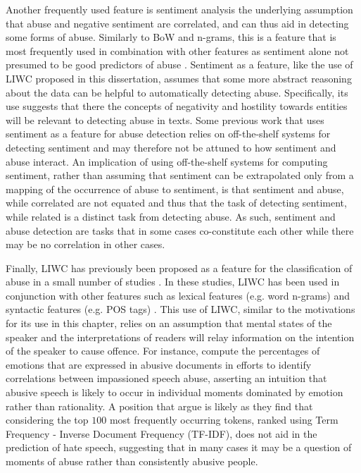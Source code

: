 Another frequently used feature is sentiment  analysis \citep{Fortuna:2018}  the underlying assumption that abuse and negative sentiment are correlated, and can thus aid in detecting some forms of abuse.
Similarly to BoW and n-grams, this is a feature that is most frequently used in combination with other features as sentiment  alone  not presumed to be good predictors of abuse \citep{Fortuna:2018}.
Sentiment as a feature, like the use of LIWC proposed in this dissertation, assumes that some more abstract reasoning about the data can be helpful to automatically detecting abuse.
Specifically, its use suggests that there the concepts of negativity and hostility towards entities will be relevant to detecting abuse in texts.
Some previous work that uses sentiment as a feature for abuse detection \citep{Davidson:2017} relies on off-the-shelf systems for detecting sentiment and may therefore not be attuned to how sentiment and abuse interact.
An implication of using off-the-shelf systems for computing sentiment, rather than assuming that sentiment can be extrapolated only from a mapping of the occurrence of abuse to sentiment, is that sentiment and abuse, while correlated are not equated and thus that the task of detecting sentiment, while related is a distinct task from detecting abuse.
As such, sentiment and abuse detection are tasks that in some cases co-constitute each other while there may be no correlation in other cases.

Finally, LIWC has previously been proposed as a feature for the classification of abuse in a small number of studies \citep{Nina:2018,Joksimovic:2019}.
In these studies, LIWC has been used in conjunction with other features such as lexical features (e.g. word n-grams) and syntactic features (e.g. POS tags) \citep{Joksimovic:2019}.
This use of LIWC, similar to the motivations for its use in this chapter, relies on an assumption that  mental states of the speaker and the interpretations of readers will relay information on the intention of the speaker to cause offence.
For instance, \citet{Nina:2018} compute the percentages of emotions that are expressed in abusive documents in efforts to identify correlations between impassioned  speech  abuse, asserting an intuition that abusive speech is likely to occur in individual moments dominated by emotion rather than rationality.
A position that \citep{Waseem:2016} argue is likely as they find that considering the top $100$ most frequently occurring tokens, ranked using Term Frequency - Inverse Document Frequency (TF-IDF), does not aid in the prediction of hate speech, suggesting that in many cases it may be a question of moments of abuse rather than consistently abusive people.

